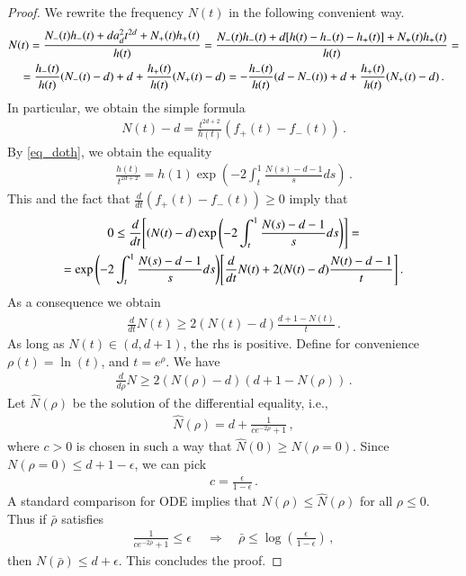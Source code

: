 \documentclass[11pt]{article}
\begin{document}
\begin{proof}
We rewrite the frequency $N(t)$ in the following convenient way.
\begin{gather}\label{eq_Nhpm}
  N(t) = \frac{N_-(t) h_-(t) + d a_d^2 t^{2d} + N_+(t) h_+(t) }{h(t)} = \frac{N_-(t) h_-(t) + d {\left[{h(t)-h_-(t)-h_+(t)}\right]}+ N_+(t) h_+(t) }{h(t)}=\\
 \notag= \frac{h_-(t)}{h(t)} {\left({N_-(t)-d}\right)} + d + \frac{h_+(t)}{h(t)} {\left({N_+(t)-d}\right)}  = -\frac{h_-(t)}{h(t)} {\left({d-N_-(t)}\right)} + d + \frac{h_+(t)}{h(t)} {\left({N_+(t)-d}\right)}      \, .
\end{gather}
In particular, we obtain the simple formula
\begin{gather}
N(t)-d = \frac{t^{2d+2}}{h(t)}{\left({f_+(t) - f_-(t)}\right)}\, .
\end{gather}
By \eqref{eq_doth}, we obtain the equality
\begin{gather}
\frac{h(t)}{t^{2d+2}} = h(1)\exp{\left({- 2\int_t^1 \frac{ N(s)-d-1}{s}ds}\right)}\, .
\end{gather}
This and the fact that $\frac{d}{dt} {\left({f_+(t)-f_-(t)}\right)}\geq 0$ imply that
\begin{gather}
 0\leq \frac{d}{dt} {\left[{{\left({N(t)-d}\right)} \exp{\left({- 2\int_t^1 \frac{ N(s)-d-1}{s}ds}\right)} }\right]}= \\
 \notag = \exp{\left({- 2\int_t^1 \frac{ N(s)-d-1}{s}ds}\right)} {\left[{\frac d {dt} { N(t)} + 2(N(t)-d)\frac{ N(t)-d-1}{t}}\right]}\, .
\end{gather}
As a consequence we obtain
\begin{gather}\label{eq_dotN}
 \frac{d}{dt} N(t) \geq 2( N(t)-d)\frac{d+1- N(t)}{t}\, .
\end{gather}
As long as $ N(t)\in (d,d+1)$, the rhs is positive. Define for convenience $\rho(t)=\ln(t)$, and $t=e^{\rho}$. We have
\begin{gather}\label{eq_dNdrho}
 \frac {d}{d\rho} N \geq 2( N(\rho)-d){\left({d+1-N(\rho)}\right)}\, .
\end{gather}
Let $\hat N(\rho)$ be the solution of the differential equality, i.e.,
\begin{gather}
 \hat N(\rho) = d + \frac{1}{c e^{-2\rho} +1} \, ,
\end{gather}
where $c>0$ is chosen in such a way that $\hat N(0)\geq N(\rho=0)$. Since $N(\rho=0)\leq d+1-\epsilon$, we can pick
\begin{gather}
 c=\frac{\epsilon}{1-\epsilon}\, .
\end{gather}
A standard comparison for ODE implies that $N(\rho)\leq \hat N(\rho)$ for all $\rho\leq 0$. Thus if $\bar \rho$ satisfies
\begin{gather}
 \frac{1}{c e^{-2\bar \rho}+1}\leq \epsilon\, \quad \Longrightarrow \quad \bar \rho \leq \log{\left({\frac{\epsilon}{1-\epsilon}}\right)}\, ,
\end{gather}
then $N(\bar \rho)\leq d+\epsilon$. This concludes the proof.
\end{proof}
\end{document}
